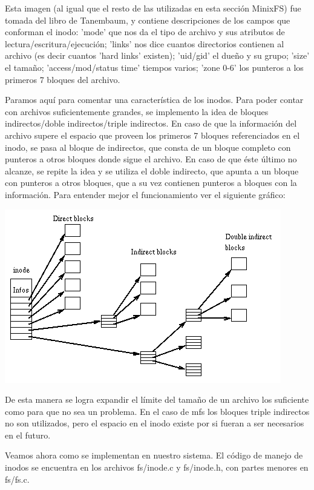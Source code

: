 Esta imagen (al igual que el resto de las utilizadas en esta sección MinixFS)
fue tomada del libro de Tanembaum, y contiene descripciones de los
campos que conforman el inodo: 'mode' que nos da el tipo de archivo y sus
atributos de lectura/escritura/ejecución; 'links' nos dice cuantos directorios
contienen al archivo (es decir cuantos 'hard links' existen); 'uid/gid' el dueño
y su grupo; 'size' el tamaño; 'access/mod/status time' tiempos varios; 'zone
0-6' los punteros a los primeros 7 bloques del archivo.

Paramos aquí para comentar una característica de los inodos. Para poder contar
con archivos suficientemente grandes, se implemento la idea de bloques
indirectos/doble indirectos/triple indirectos. En caso de que la
información del archivo supere el espacio que proveen los primeros 7 bloques
referenciados en el inodo, se pasa al bloque de indirectos, que consta de un
bloque completo con punteros a otros bloques donde sigue el archivo. En caso de
que éste último no alcanze, se repite la idea y se utiliza el doble indirecto,
que apunta a un bloque con punteros a otros bloques, que a su vez contienen
punteros a bloques con la información. Para entender mejor el funcionamiento ver
el siguiente gráfico:

\begin{center}
\includegraphics[scale=0.5]{../img/inode_links.png}
\end{center}

De esta manera se logra expandir el límite del tamaño de un archivo los
suficiente como para que no sea un problema. En el caso de mfs los bloques
triple indirectos no son utilizados, pero el espacio en el inodo existe por si
fueran a ser necesarios en el futuro.

Veamos ahora como se implementan en nuestro sistema. El código de manejo de
inodos se encuentra en los archivos fs/inode.c y fs/inode.h, con partes menores
en fs/fs.c.

